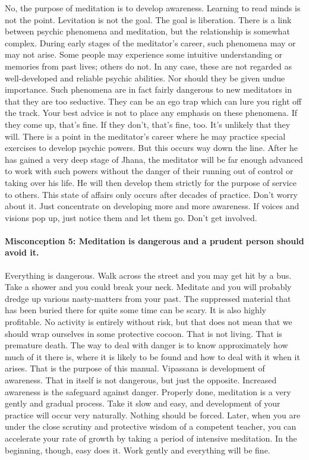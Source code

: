 No, the purpose of meditation is to develop awareness. Learning to read minds is not
the point. Levitation is not the goal. The goal is liberation. There is a link
between psychic phenomena and meditation, but the relationship is somewhat
complex. During early stages of the meditator's career, such phenomena may or
may not arise. Some people may experience some intuitive understanding or
memories from past lives; others do not. In any case, these are not regarded as
well-developed and reliable psychic abilities. Nor should they be given undue
importance. Such phenomena are in fact fairly dangerous to new meditators in
that they are too seductive. They can be an ego trap which can lure you right
off the track. Your best advice is not to place any emphasis on these phenomena.
If they come up, that's fine. If they don't, that's fine, too. It's unlikely
that they will. There is a point in the meditator's career where he may practice
special exercises to develop psychic powers. But this occurs way down the line.
After he has gained a very deep stage of Jhana, the meditator will be far enough
advanced to work with such powers without the danger of their running out of
control or taking over his life. He will then develop them strictly for the
purpose of service to others. This state of affairs only occurs after decades of
practice. Don't worry about it. Just concentrate on developing more and more
awareness. If voices and visions pop up, just notice them and let them go. Don't
get involved.

\paragraph*{Misconception 5: Meditation is dangerous and a prudent person should avoid it.}

Everything is dangerous. Walk across the street and you may get hit by a bus.
Take a shower and you could break your neck.
Meditate and you will probably dredge up various nasty-matters from your past.
The suppressed material that has been buried there for quite some time can be
scary. It is also highly profitable. No activity is entirely without risk, but
that does not mean that we should wrap ourselves in some protective cocoon. That
is not living. That is premature death. The way to deal with danger is to know
approximately how much of it there is, where it is likely to be found and how to
deal with it when it arises. That is the purpose of this manual. Vipassana is
development of awareness. That in itself is not dangerous, but just the
opposite. Increased awareness is the safeguard against danger. Properly done,
meditation is a very gently and gradual process. Take it slow and easy, and
development of your practice will occur very naturally. Nothing should be
forced. Later, when you are under the close scrutiny and protective wisdom of a
competent teacher, you can accelerate your rate of growth by taking a period of
intensive meditation. In the beginning, though, easy does it. Work gently and
everything will be fine.

